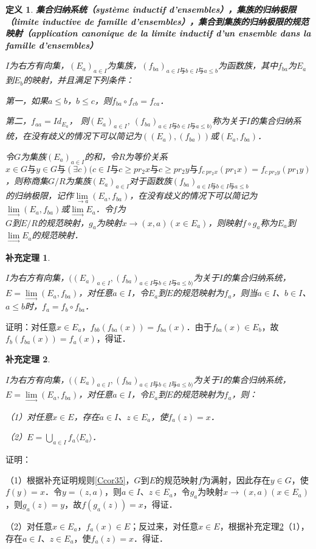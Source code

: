 \documentclass[12pt, a4paper, oneside]{book}
\newtheorem{cor}{补充定理}
\newtheorem{de}{定义}
\begin{document}
			\begin{de}
				\textbf{集合归纳系统（système inductif d'ensembles），集族的归纳极限（limite inductive de famille d'ensembles），集合到集族的归纳极限的规范映射（application canonique de la limite inductif d'un ensemble dans la famille d'ensembles）}
				\par
				$I$为右方有向集，$(E_a)_{a\in I}$为集族，$(f_{ba})_{a\in I\text{与}b\in I\text{与}a\leq b}$为函数族，其中$f_{ba}$为$E_a$到$E_b$的映射，并且满足下列条件：
				\par
				第一，如果$a\leq b$，$b\leq c$，则$f_{ba}\circ f_{cb}=f_{ca}$．
				\par
				第二，$f_{aa}=Id_{E_a}$，
				则$(E_a)_{a\in I}$, $(f_{ba})_{a\in I\text{与}b\in I\text{与}a\leq b)}$称为关于$I$的集合归纳系统，在没有歧义的情况下可以简记为$((E_a), (f_{ba}))$或$(E_a, f_{ba})$．
				\par
				令$G$为集族$(E_a)_{a\in I}$的和，令$R$为等价关系$x\in G\text{与}y\in G \text{与}(\exists c)(c\in I\text{与}c\geq pr_2x\text{与}c\geq pr_2y\text{与}f_{c\ pr_2x}(pr_1x)= f_{c\ pr_2y}(pr_1y)$，则称商集$G/R$为集族$(E_a)_{a\in I}$对于函数族$(f_{ba})_{a\in I\text{与}b\in I\text{与}a\leq b}$\\的归纳极限，记作$\lim\limits_{\to a}(E_a, f_{ba})$，在没有歧义的情况下可以简记为$\lim\limits_\to (E_a, f_{ba})$或$\lim\limits_\to E_a$．令$f$为\\$G$到$E/R$的规范映射，$g_a$为映射$x\to (x, a)(x\in E_a)$，则映射$f\circ g_a$称为$E_a$到$\lim\limits_\to E_a$的规范映射．
			\end{de}
			
			\begin{cor}\label{cor423}
				\hfill\par
				$I$为右方有向集，$((E_a)_{a\in I}, (f_{ba})_{a\in I\text{与}b\in I\text{与}a\leq b)}$为关于$I$的集合归纳系统，$E=\lim\limits_\to (E_a, f_{ba})$，对任意$a\in I$，令$E_a$到$E$的规范映射为$f_a$，则当$a\in I$、$b\in I$、$a\leq b$时，$f_a=f_b\circ f_{ba}$．
			\end{cor}
			证明：对任意$x\in E_a$，$f_{bb}(f_{ba}(x))=f_{ba}(x)$．由于$f_{ba}(x)\in E_b$，故$f_b(f_{ba}(x))=f_a(x)$，得证．
			
			\begin{cor}\label{cor424}
				\hfill\par
				$I$为右方有向集，$((E_a)_{a\in I}, (f_{ba})_{a\in I\text{与}b\in I\text{与}a\leq b)}$为关于$I$的集合归纳系统，$E=\lim\limits_\to (E_a, f_{ba})$，对任意$a\in I$，令$E_a$到$E$的规范映射为$f_a$，则：
				\par
				（1）对任意$x\in E$，存在$a\in I$、$z\in E_a$，使$f_a(z)=x$．
				\par
				（2）$E=\bigcup\limits_{a\in I}f_a\langle E_a\rangle$．
			\end{cor}
			证明：
			\par
			（1）根据补充证明规则\ref{Ccor35}，$G$到$E$的规范映射$f$为满射，因此存在$y\in G$，使$f(y)=x$．令$y=(z, a)$，则$a\in I$、$z\in E_a$，令$g_a$为映射$x\to (x, a)(x\in E_a)$，则$g_a(z) =y$，故$f(g_a(z))=x$，得证．
			\par
			（2）对任意$x\in E_a$，$f_a(x)\in E$；反过来，对任意$x\in E$，根据补充定理\ref{cor424}（1），存在$a\in I$、$z\in E_a$，使$f_a(z)=x$．得证．
			
\end{document}
